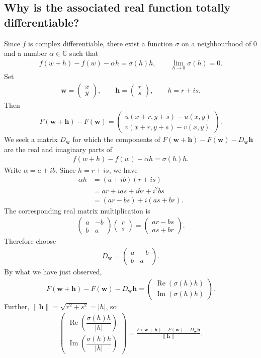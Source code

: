 \documentclass[11pt]{article}
\theoremstyle{plain}
\theoremstyle{definition}
\theoremstyle{remark}
\numberwithin{equation}{section}
\newcommand{\be}{\begin{eqnarray}}
\newcommand{\ee}{\end{eqnarray}}
\newcommand{\C}{\mathbb{C}}
\newcommand{\ww}{\mathbf w}
\newcommand{\hh}{\mathbf h}
\DeclareMathOperator{\Real}{Re}
\DeclareMathOperator{\Imag}{Im}
\begin{document}
\subsection{Why is the associated real function totally differentiable?}
Since $f$ is complex differentiable, there exist a function $\sigma$ on
a neighbourhood of $0$ and a number $\alpha\in\C$ such that
\be
 f(w+h)-f(w)-\alpha h=\sigma(h)h,
 \qquad \lim_{h\to0}\sigma(h)=0.
\ee
Set
\be
 \ww=\begin{pmatrix}x\\y\end{pmatrix},\qquad
 \hh=\begin{pmatrix}r\\s\end{pmatrix},\qquad h=r+is.
\ee
Then
\be
 F(\ww+\hh)-F(\ww)=
 \begin{pmatrix}
 u(x+r,y+s)-u(x,y)\\
 v(x+r,y+s)-v(x,y)
 \end{pmatrix}.
\ee
We seek a matrix $D_{\ww}$ for which the components of
$F(\ww+\hh)-F(\ww)-D_{\ww}\hh$ are the real and imaginary parts of
\be
 f(w+h)-f(w)-\alpha h=\sigma(h)h.
\ee
Write $\alpha=a+ib$. Since $h=r+is$, we have
\begin{align*}
 \alpha h&=(a+ib)(r+is)\\
 &=ar+ias+ibr+i^2bs\\
 &=(ar-bs)+i(as+br).
\end{align*}
The corresponding real matrix multiplication is
\be
 \begin{pmatrix}a&-b\\b&a\end{pmatrix}
 \begin{pmatrix}r\\s\end{pmatrix}
 =\begin{pmatrix}ar-bs\\as+br\end{pmatrix}.
\ee
Therefore choose
\be
 D_{\ww}=\begin{pmatrix}a&-b\\b&a\end{pmatrix}.
\ee
By what we have just observed,
\be{}
 F(\ww+\hh)-F(\ww)-D_{\ww}\hh
 =\begin{pmatrix}\Real(\sigma(h)h)\\\Imag(\sigma(h)h)\end{pmatrix}.
\ee Further, $\|\hh\|=\sqrt{r^2+s^2}=|h|$, so
\be
\begin{pmatrix}
	\Real\left(\dfrac{\sigma(h)h}{|h|}\right)\\[0.7em]
	\Imag\left(\dfrac{\sigma(h)h}{|h|}\right)
\end{pmatrix}
=\frac{F(\ww+\hh)-F(\ww)-D_{\ww}\hh}{\|\hh\|}.
\ee
\end{document}

